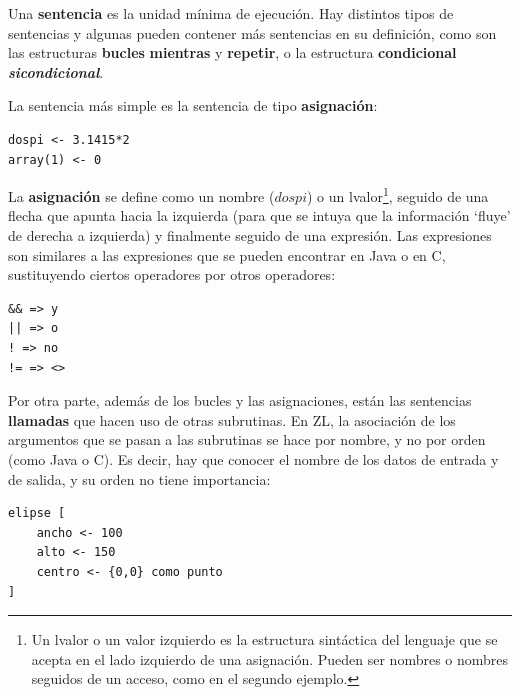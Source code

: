 \documentclass{report}
\begin{document}
	\vspace{10px}
	
	Una \textbf{sentencia} es la unidad mínima de ejecución. Hay distintos tipos de sentencias y algunas pueden contener más sentencias en su definición, como son las estructuras \textbf{bucles} \textbf{mientras} y \textbf{repetir}, o la estructura \textbf{condicional} \textbf{\textit{sicondicional}}. 
	
	\vspace{10px}
	
	La sentencia más simple es la sentencia de tipo \textbf{asignación}:
	
	\vspace{10px}
	
\begin{BVerbatim}
dospi <- 3.1415*2
array(1) <- 0
\end{BVerbatim}
	
	\vspace{10px}
	
	La \textbf{asignación} se define como un nombre ($dospi$) o un lvalor\footnote{Un lvalor o un valor izquierdo es la estructura sintáctica del lenguaje que se acepta en el lado izquierdo de una asignación. Pueden ser nombres o nombres seguidos de un acceso, como en el segundo ejemplo.}, seguido de una flecha que apunta hacia la izquierda (para que se intuya que la información `fluye' de derecha a izquierda) y finalmente seguido de una expresión. Las expresiones son similares a las expresiones que se pueden encontrar en Java o en C, sustituyendo ciertos operadores por otros operadores:
	
	\vspace{10px}
	
\begin{BVerbatim}
&& => y 
|| => o
! => no 
!= => <>
\end{BVerbatim} 

	\vspace{10px} 
	
	Por otra parte, además de los bucles y las asignaciones, están las sentencias \textbf{llamadas} que hacen uso de otras subrutinas. En ZL, la asociación de los argumentos que se pasan a las subrutinas se hace por nombre, y no por orden (como Java o C). Es decir, hay que conocer el nombre de los datos de entrada y de salida, y su orden no tiene importancia:
	
	\vspace{10px}
	
\begin{BVerbatim}
elipse [
	ancho <- 100
	alto <- 150
	centro <- {0,0} como punto
]
\end{BVerbatim}	
\end{document}
